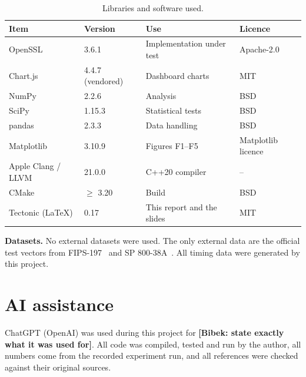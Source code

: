 \begin{table}[htbp]
\centering
\small
\renewcommand{\arraystretch}{1.15}
\begin{tabular}{@{}P{0.22\textwidth}P{0.20\textwidth}P{0.22\textwidth}P{0.26\textwidth}@{}}
\toprule
Item & Version & Use & Licence \\
\midrule
OpenSSL  & 3.6.1 & Implementation under test & Apache-2.0 \\
Chart.js & 4.4.7 (vendored) & Dashboard charts & MIT \\
NumPy & 2.2.6 & Analysis & BSD \\
SciPy & 1.15.3 & Statistical tests & BSD \\
pandas & 2.3.3 & Data handling & BSD \\
Matplotlib & 3.10.9 & Figures F1--F5 & Matplotlib licence \\
Apple Clang / LLVM & 21.0.0 & C++20 compiler & -- \\
CMake & $\ge$ 3.20 & Build & BSD \\
Tectonic (\LaTeX) & 0.17 & This report and the slides & MIT \\
\bottomrule
\end{tabular}
\caption{Libraries and software used.}
\label{tab:tools}
\end{table}

\textbf{Datasets.} No external datasets were used. The only external data are the official test vectors from FIPS-197~\cite{fips197} and SP 800-38A~\cite{sp80038a}. All timing data were generated by this project.

\section{AI assistance}

ChatGPT (OpenAI) was used during this project for \textbf{[Bibek: state exactly what it was used for]}. All code was compiled, tested and run by the author, all numbers come from the recorded experiment run, and all references were checked against their original sources.
